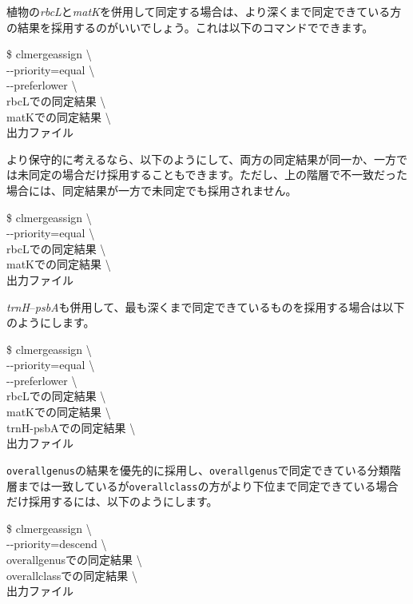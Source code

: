 \documentclass[titlepage,10pt,a4paper,english]{jsbook}
\newenvironment{cmd}{\begin{oframed}\raggedright\ttfamily\footnotesize\setlength{\baselineskip}{1.4em}}{\end{oframed}\vspace{-1em}}
\begin{document}
植物の\textit{rbcL}と\textit{matK}を併用して同定する場合は、より深くまで同定できている方の結果を採用するのがいいでしょう。これは以下のコマンドでできます。
\begin{cmd}
\$ clmergeassign {\textbackslash}\\
{-}{-}priority=equal {\textbackslash}\\
{-}{-}preferlower {\textbackslash}\\
rbcLでの同定結果 {\textbackslash}\\
matKでの同定結果 {\textbackslash}\\
出力ファイル
\end{cmd}
より保守的に考えるなら、以下のようにして、両方の同定結果が同一か、一方では未同定の場合だけ採用することもできます。ただし、上の階層で不一致だった場合には、同定結果が一方で未同定でも採用されません。
\begin{cmd}
\$ clmergeassign {\textbackslash}\\
{-}{-}priority=equal {\textbackslash}\\
rbcLでの同定結果 {\textbackslash}\\
matKでの同定結果 {\textbackslash}\\
出力ファイル
\end{cmd}
\textit{trnH}--\textit{psbA}も併用して、最も深くまで同定できているものを採用する場合は以下のようにします。
\begin{cmd}
\$ clmergeassign {\textbackslash}\\
{-}{-}priority=equal {\textbackslash}\\
{-}{-}preferlower {\textbackslash}\\
rbcLでの同定結果 {\textbackslash}\\
matKでの同定結果 {\textbackslash}\\
trnH-psbAでの同定結果 {\textbackslash}\\
出力ファイル
\end{cmd}
\texttt{overall{\textunderscore}genus}の結果を優先的に採用し、\texttt{overall{\textunderscore}genus}で同定できている分類階層までは一致しているが\texttt{overall{\textunderscore}class}の方がより下位まで同定できている場合だけ採用するには、以下のようにします。
\begin{cmd}
\$ clmergeassign {\textbackslash}\\
{-}{-}priority=descend {\textbackslash}\\
overall{\textunderscore}genusでの同定結果 {\textbackslash}\\
overall{\textunderscore}classでの同定結果 {\textbackslash}\\
出力ファイル
\end{cmd}
\end{document}
